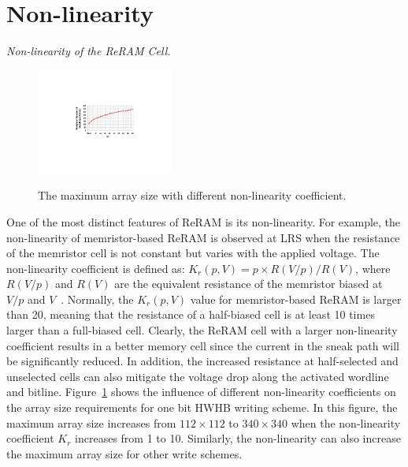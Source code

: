 \section{Non-linearity}\label{sec:scale}
\vspace{6pt} \emph{Non-linearity of the ReRAM Cell.} \vspace{6pt}

\begin{figure}[!b]
\centering
  \includegraphics[width=0.4\textwidth]{./figures/non_linear_f}\\
  \caption{The maximum array size with different non-linearity coefficient.}\label{fig:non_linear}
\end{figure}
One of the most distinct features of ReRAM is its non-linearity. For
example, the non-linearity of memristor-based ReRAM is observed at LRS
when the resistance of the memristor cell is not constant but varies with
the applied voltage. The non-linearity coefficient is defined as:
$K_r(p,V) = p \times R(V/p)/R(V)$, where $R(V/p)$ and $R(V)$ are the
equivalent resistance of the memristor biased at $V/p$ and
$V$~\cite{memristor:Cong}. Normally, the $K_r(p,V)$ value for
memristor-based ReRAM is larger than 20, meaning that the resistance of a
half-biased  cell is at least 10 times larger than a full-biased cell.
Clearly, the ReRAM cell with a larger non-linearity coefficient results in
a better memory cell since the current in the sneak path will be
significantly reduced. In addition, the increased resistance at
half-selected and unselected cells can also mitigate the voltage drop
along the activated wordline and bitline. Figure~\ref{fig:non_linear}
shows the influence of different non-linearity coefficients on the array
size requirements for one bit HWHB writing scheme. In this figure, the
maximum array size increases from $112 \times 112$ to $340 \times 340$
when the non-linearity coefficient $K_r$ increases from 1 to 10.
Similarly, the non-linearity can also increase the maximum array size for
other write schemes.


